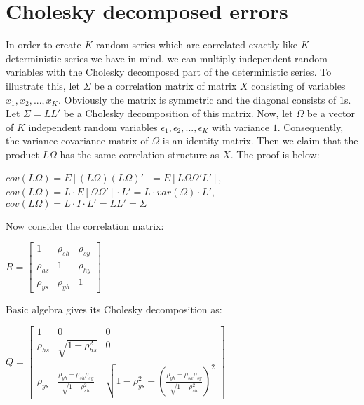 \chapter{Cholesky decomposed errors}
\label{appa}

In order to create $K$ random series which are correlated exactly like $K$ deterministic series we have in mind, we can multiply independent random variables with the Cholesky decomposed part of the deterministic series. To illustrate this, let $\Sigma$ be a correlation matrix of matrix $X$ consisting of variables $x_1, x_2, ..., x_K$. Obviously the matrix is symmetric and the diagonal consists of $1$s. Let $\Sigma = LL'$ be a Cholesky decomposition of this matrix. Now, let $\Omega$ be a vector of $K$ independent random variables $\epsilon_1, \epsilon_2, ..., \epsilon_K$ with variance $1$. Consequently, the variance-covariance matrix of $\Omega$ is an identity matrix. Then we claim that the product $L\Omega$ has the same correlation structure as $X$. The proof is below:

\begin{center}
  $cov(L\Omega) = E[(L\Omega)(L\Omega)'] = E[L\Omega\Omega'L']$,\\
  $cov(L\Omega) = L \cdot E[\Omega\Omega'] \cdot L' = L \cdot var(\Omega) \cdot L'$,\\
  $cov(L\Omega) = L\cdot I \cdot L' = LL' = \Sigma$
\end{center}

Now consider the correlation matrix:

\begin{center}
	$R = \begin{bmatrix}
					1 & \rho_{sh} & \rho_{sy} \\
					\rho_{hs} & 1 & \rho_{hy} \\
					\rho_{ys} & \rho_{yh} & 1
			\end{bmatrix}
	$
\end{center}

Basic algebra gives its Cholesky decomposition as:

\begin{center}
	$Q = \begin{bmatrix}
					1 & 0 & 0 \\
					\rho_{hs} & \sqrt{1-\rho^2_{hs}} & 0 \\
					\rho_{ys} & \frac{\rho_{yh} - \rho_{sh}\rho_{sy}}{\sqrt{1-\rho^2_{sh}}} & \sqrt{1-\rho^2_{ys}-(\frac{\rho_{yh} - \rho_{sh}\rho_{sy}}{\sqrt{1-\rho^2_{sh}}})^2}
			\end{bmatrix}
	$
\end{center}
